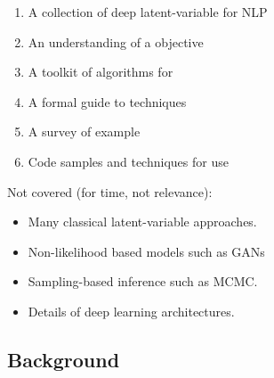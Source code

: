 \begin{frame}{}



 \begin{enumerate}
    \item A collection of deep latent-variable  for NLP
    \air
    
    \item An understanding of a  objective
    \air
    
    \item A toolkit of algorithms for 
    
    \air
    \item A formal guide to  techniques
    \air 
        
    \item A survey of example 
    \air
    
    \item Code samples and techniques for  use
 \end{enumerate}
    
\end{frame}

\begin{frame}{}
    Not covered (for time, not relevance):
    \begin{itemize}
        \item Many classical latent-variable approaches.
            \air
            
        \item Non-likelihood based models such as GANs
            \air
        
        \item Sampling-based inference such as MCMC.
            \air 

        \item Details of deep learning architectures.
    \end{itemize}
\end{frame}


\subsection{Background}

